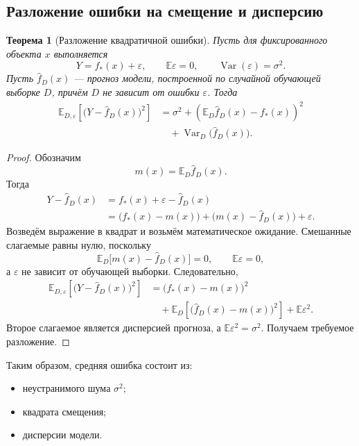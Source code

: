\documentclass[12pt,a4paper]{article}
\newtheorem{theorem}{Теорема}[section]
\theoremstyle{definition}
\theoremstyle{remark}
\newcommand{\E}{\mathbb{E}}
\newcommand{\Var}{\operatorname{Var}}
\begin{document}
\subsection{Разложение ошибки на смещение и дисперсию}

\begin{theorem}[Разложение квадратичной ошибки]
Пусть для фиксированного объекта $x$ выполняется
\[
    Y=f_*(x)+\varepsilon,
    \qquad
    \E\varepsilon=0,
    \qquad
    \Var(\varepsilon)=\sigma^2.
\]
Пусть $\widehat f_D(x)$ --- прогноз модели, построенной по случайной
обучающей выборке $D$, причём $D$ не зависит от ошибки $\varepsilon$.
Тогда
\[
\begin{split}
    \E_{D,\varepsilon}
    \left[
        \bigl(Y-\widehat f_D(x)\bigr)^2
    \right]
    &=
    \sigma^2
    +
    \left(
        \E_D\widehat f_D(x)-f_*(x)
    \right)^2\\
    &\quad+
    \Var_D\bigl(\widehat f_D(x)\bigr).
\end{split}
\]
\end{theorem}

\begin{proof}
Обозначим
\[
    m(x)=\E_D\widehat f_D(x).
\]
Тогда
\[
\begin{split}
    Y-\widehat f_D(x)
    &=
    f_*(x)+\varepsilon-\widehat f_D(x)\\
    &=
    \bigl(f_*(x)-m(x)\bigr)
    +
    \bigl(m(x)-\widehat f_D(x)\bigr)
    +
    \varepsilon.
\end{split}
\]
Возведём выражение в квадрат и возьмём математическое ожидание. Смешанные
слагаемые равны нулю, поскольку
\[
    \E_D\bigl[m(x)-\widehat f_D(x)\bigr]=0,
    \qquad
    \E\varepsilon=0,
\]
а $\varepsilon$ не зависит от обучающей выборки. Следовательно,
\[
\begin{split}
    \E_{D,\varepsilon}
    \left[
        \bigl(Y-\widehat f_D(x)\bigr)^2
    \right]
    &=
    \bigl(f_*(x)-m(x)\bigr)^2\\
    &\quad+
    \E_D
    \left[
        \bigl(\widehat f_D(x)-m(x)\bigr)^2
    \right]
    +
    \E\varepsilon^2.
\end{split}
\]
Второе слагаемое является дисперсией прогноза, а
$\E\varepsilon^2=\sigma^2$. Получаем требуемое разложение.
\end{proof}

Таким образом, средняя ошибка состоит из:

\begin{itemize}
    \item неустранимого шума $\sigma^2$;
    \item квадрата смещения;
    \item дисперсии модели.
\end{itemize}
\end{document}
